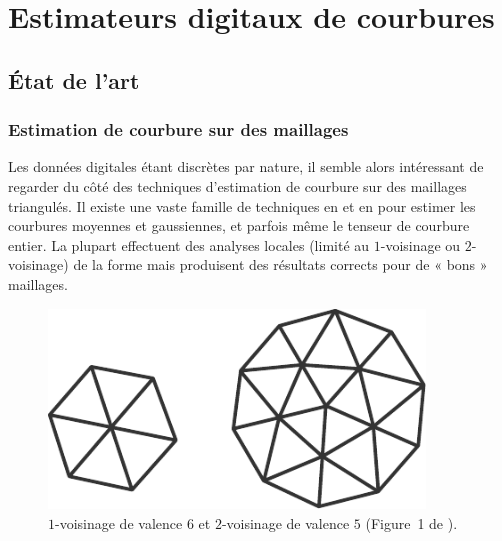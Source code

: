 %
\chapter{Estimateurs digitaux de courbures}
\label{sec:estimators}


\setcounter{minitocdepth}{4}
\minitoc

\newpage

\section{État de l'art}

\subsection{Estimation de courbure sur des maillages}

Les données digitales étant discrètes par nature, il semble alors intéressant de
regarder du côté des techniques d'estimation de courbure sur des maillages
triangulés. Il existe une vaste famille de techniques en \ComputerGraphics et en
\GeometryProcessing pour estimer les courbures moyennes et gaussiennes, et
parfois même le tenseur de courbure entier. La plupart effectuent des analyses
locales (\cad limité au $1$-voisinage ou $2$-voisinage) de la forme mais
produisent des résultats corrects pour de « bons » maillages.

\begin{figure}[ht]
    \begin{center}
      \includegraphics[width=10cm]{images/Curvature/OneRingNeighborhood}
    \end{center}
    \caption[$1$-voisinage et $2$-voisinage.]{$1$-voisinage de valence $6$ et
    $2$-voisinage de valence $5$ (Figure~1 de \cite{Gatzke2006}).}
    \label{fig:one-ring-neighborhood}
\end{figure}

